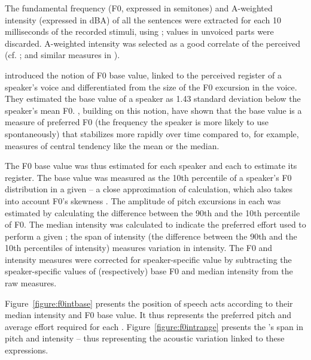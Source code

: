 \documentclass[output=paper]{LSP/langsci}
\begin{document}
The fundamental frequency (F0, expressed in semitones) and A-weighted intensity (expressed in dBA) of all the sentences were extracted for each 10 milliseconds of the recorded stimuli, using  \citep{Boersma.praat}; values in unvoiced parts were discarded. A-weighted intensity was selected as a good correlate of the perceived  (cf. \citealt{lienard2013strength}; and similar measures in \citealt{Traunmuller2000}). 

\citet{Traunmuller1995} introduced the notion of F0 base value, linked to the perceived register of a speaker's voice and differentiated from the size of the F0 excursion in the voice. 
They estimated the base value of a speaker as 1.43 standard deviation below the speaker's mean F0. 
\citet{arantes2014}, building on this notion, have shown that the base value is a measure of preferred F0 (the frequency the speaker is more likely to use spontaneously) that stabilizes more rapidly over time compared to, for example, measures of central tendency like the mean or the median.

The F0 base value was thus estimated for each speaker and each  to estimate its register. 
The base value was measured as the 10th percentile of a speaker's F0 distribution in a given  -- a close approximation of \citet{Traunmuller1995} calculation, which also takes into account F0's skewness \citep[cf.][for a slightly different choice]{arantes2014}. 
The amplitude of pitch excursions in each  was estimated by calculating the difference between the 90th and the 10th percentile of F0. 
The median intensity was calculated to indicate the preferred effort used to perform a given ; the span of intensity (the difference between the 90th and the 10th percentiles of intensity) measures variation in intensity.
The F0 and intensity measures were corrected for speaker-specific value by subtracting the speaker-specific values of (respectively) base F0 and median intensity from the raw measures.

Figure~\ref{figure:f0intbase} presents the position of speech acts according to their median intensity and F0 base value. 
It thus represents the preferred pitch and average effort required for each . 
Figure~\ref{figure:f0intrange} presents the 's span in pitch and intensity -- thus representing the acoustic variation linked to these expressions.\largerpage[-1]
\end{document}
